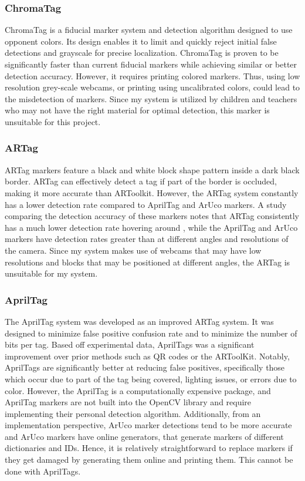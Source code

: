 \documentclass[oneside,%
                    author={Malak Hajji},
                    degree={BSc},
                    title={Designing An Accessible Ozobot Programming Platform for Students},
                  subtitle={With Mixed Visual Abilities}]{dissertation}
\begin{document}
\subsubsection{ChromaTag}
ChromaTag\cite{chroma} is a fiducial marker system and detection algorithm designed to use opponent colors. Its design enables it to limit and quickly reject initial false detections and grayscale for precise localization. ChromaTag is proven to be significantly faster than current fiducial markers while achieving similar or better detection accuracy. However, it requires printing colored markers. Thus, using low resolution grey-scale webcams, or printing using uncalibrated colors, could lead to the misdetection of markers. Since my system is utilized by children and teachers who may not have the right material for optimal detection, this marker is unsuitable for this project.

\subsubsection{ARTag}
ARTag markers\cite{artag} feature a black and white block shape pattern inside a dark black border. ARTag can effectively detect a tag if part of the border is occluded, making it more accurate than ARToolkit. However, the ARTag system constantly has a lower detection rate compared to AprilTag and ArUco markers. A study comparing the detection accuracy of these markers notes that ARTag consistently has a much lower detection rate hovering around , while the AprilTag and ArUco markers have detection rates greater than  at different angles and resolutions of the camera\cite{comparison}. Since my system makes use of webcams that may have low resolutions and blocks that may be positioned at different angles, the ARTag is unsuitable for my system.

\subsubsection{AprilTag}
The AprilTag\cite{april} system was developed as an improved ARTag system. It was designed to minimize false positive confusion rate and to minimize the number of bits per tag.
Based off experimental data, AprilTags was a significant improvement over prior methods such as QR codes or the ARToolKit. Notably, AprilTags are significantly better at reducing false positives, specifically those which occur due to part of the tag being covered, lighting issues, or errors due to color. However, the AprilTag is a computationally expensive package, and AprilTag markers are not built into the OpenCV library and require implementing their personal detection algorithm. Additionally, from an implementation perspective, ArUco marker detections tend to be more accurate and ArUco markers have online generators, that generate markers of different dictionaries and IDs. Hence, it is relatively straightforward to replace markers if they get damaged by generating them online and printing them. This cannot be done with AprilTags.
\end{document}
